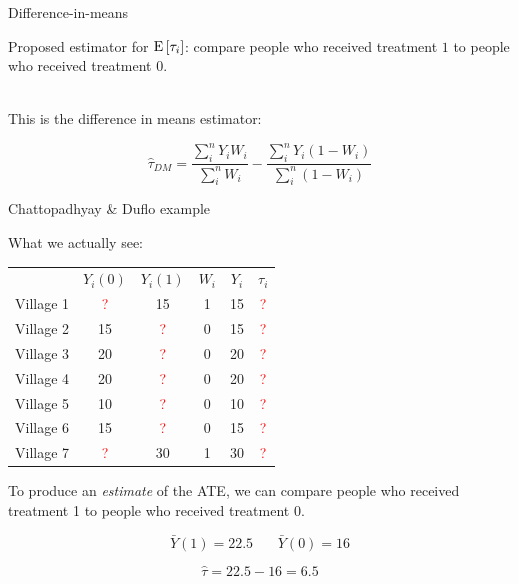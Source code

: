 \documentclass[xcolor={dvipsnames},handout]{beamer}
\begin{document}

\begin{frame}{Difference-in-means}

Proposed estimator for ${\textrm E}\,[\tau_i]$: compare people who received treatment $1$ to people who received treatment $0$. \\~\


This is the difference in means estimator:

$$
\hat\tau_{DM} = \frac{\sum_i^n Y_i W_i}{\sum_i^n W_i} - \frac{\sum_i^n Y_i (1-W_i)}{\sum_i^n (1-W_i)}
$$

\end{frame}



\begin{frame}{Chattopadhyay \& Duflo example}

What we actually see:

\begin{table}[]
\begin{tabular}{lccccc}
& $Y_i(0)$ & $Y_i(1)$ & $W_i$ & $Y_i$ & $\tau_i$ \\
Village 1 & \textcolor{red}{?} & 15 & 1 & 15 & \textcolor{red}{?} \\
Village 2 & 15 & \textcolor{red}{?} & 0 & 15 & \textcolor{red}{?} \\
Village 3 & 20 & \textcolor{red}{?} & 0 & 20 & \textcolor{red}{?} \\
Village 4 & 20 & \textcolor{red}{?} & 0 & 20 & \textcolor{red}{?} \\
Village 5 & 10 & \textcolor{red}{?} & 0 & 10 & \textcolor{red}{?} \\
Village 6 & 15 & \textcolor{red}{?} & 0 & 15 & \textcolor{red}{?} \\
Village 7 & \textcolor{red}{?} & 30 & 1 & 30 & \textcolor{red}{?}
\end{tabular}
\end{table}

To produce an \textit{estimate} of the ATE, we can compare people who received treatment 1 to people who received treatment 0.

$$
\bar{Y}(1) = 22.5 \ \ \ \ \ \ \ \ \bar{Y}(0) = 16
$$

$$
\hat{\tau} = 22.5 - 16 = \bm{6.5}
$$


\end{frame}
\end{document}
